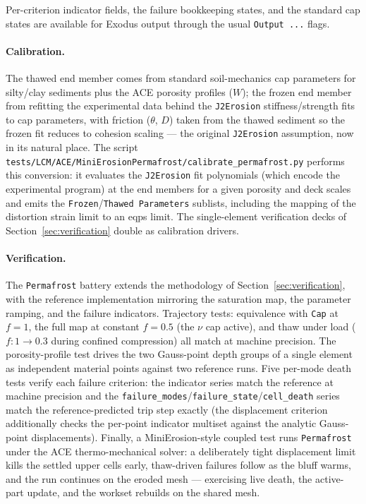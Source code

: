 \documentclass[12pt]{article}
\begin{document}
Per-criterion indicator fields, the failure bookkeeping states, and
the standard cap states are available for Exodus output through the
usual \texttt{Output ...} flags.

\paragraph{Calibration.}
The thawed end member comes from standard soil-mechanics cap
parameters for silty/clay sediments plus the ACE porosity profiles
($W$); the frozen end member from refitting the experimental data
behind the \texttt{J2Erosion} stiffness/strength fits to cap
parameters, with friction ($\theta$, $D$) taken from the thawed
sediment so the frozen fit reduces to cohesion scaling --- the
original \texttt{J2Erosion} assumption, now in its natural place.
The script
\texttt{tests/LCM/ACE/MiniErosionPermafrost/calibrate\_permafrost.py}
performs this conversion: it evaluates the \texttt{J2Erosion} fit
polynomials (which encode the experimental program) at the end
members for a given porosity and deck scales and emits the
\texttt{Frozen}/\texttt{Thawed Parameters} sublists, including the
mapping of the distortion strain limit to an eqps limit. The
single-element verification decks of Section~\ref{sec:verification}
double as calibration drivers.

\paragraph{Verification.}
The \texttt{Permafrost} battery extends the methodology of
Section~\ref{sec:verification}, with the reference implementation
mirroring the saturation map, the parameter ramping, and the failure
indicators. Trajectory tests: equivalence with \texttt{Cap} at
$f = 1$, the full map at constant $f = 0.5$ (the $\nu$ cap active),
and thaw under load ($f: 1 \to 0.3$ during confined compression) all
match at machine precision. The porosity-profile test drives the two
Gauss-point depth groups of a single element as independent material
points against two reference runs. Five per-mode death tests verify
each failure criterion: the indicator series match the reference at
machine precision and the
\texttt{failure\_modes}/\texttt{failure\_state}/\texttt{cell\_death}
series match the reference-predicted trip step exactly (the
displacement criterion additionally checks the per-point indicator
multiset against the analytic Gauss-point displacements). Finally, a
MiniErosion-style coupled test runs \texttt{Permafrost} under the
ACE thermo-mechanical solver: a deliberately tight displacement
limit kills the settled upper cells early, thaw-driven failures
follow as the bluff warms, and the run continues on the eroded mesh
--- exercising live death, the active-part update, and the workset
rebuilds on the shared mesh.
\end{document}
